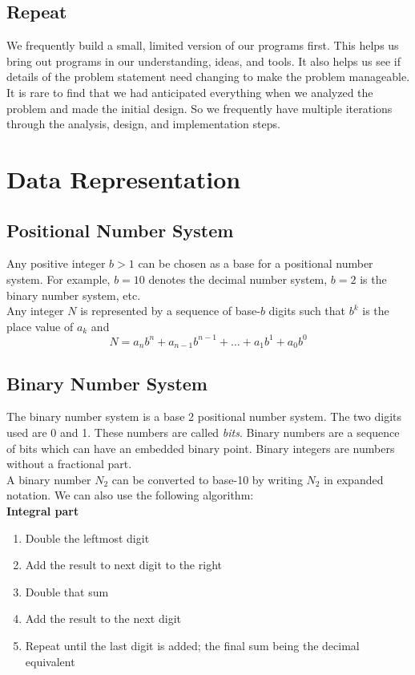 \documentclass{article}
\begin{document}
	\subsection{Repeat}
	
	We frequently build a small, limited version of our programs first. This helps us bring out programs in our understanding, ideas, and tools. It also helps us see if details of the problem statement need changing to make the problem manageable. It is rare to find that we had anticipated everything when we analyzed the problem and made the initial design. So we frequently have multiple iterations through the analysis, design, and implementation steps.



	\section{Data Representation}
	
	\subsection{Positional Number System}
	
	Any positive integer $ b > 1 $ can be chosen as a base for a positional number system. For example, $ b=10 $ denotes the decimal number system, $ b=2 $ is the binary number system, etc.\\
	
	Any integer $ N $ is represented by a sequence of base-$ b $ digits such that $ b^k $ is the place value of $ a_k $ and 
	\[
		N = a_nb^n + a_{n-1}b^{n-1} + \dots + a_1b^1 + a_0b^0 
	\]
	
	\subsection{Binary Number System}
	
	The binary number system is a base 2 positional number system. The two digits used are 0 and 1. These numbers are called \textit{bits}. Binary numbers are a sequence of bits which can have an embedded binary point. Binary integers are numbers without a fractional part.\\
	
	A binary number $ N_2 $ can be converted to base-10 by writing $ N_2 $ in expanded notation. We can also use the following algorithm:\\
	
	\textbf{Integral part}
		\begin{enumerate}[label=\arabic*.)]
			\item Double the leftmost digit
			\item Add the result to next digit to the right
			\item Double that sum
			\item Add the result to the next digit
			\item Repeat until the last digit is added; the final sum being the decimal equivalent
		\end{enumerate}
	
\end{document}
